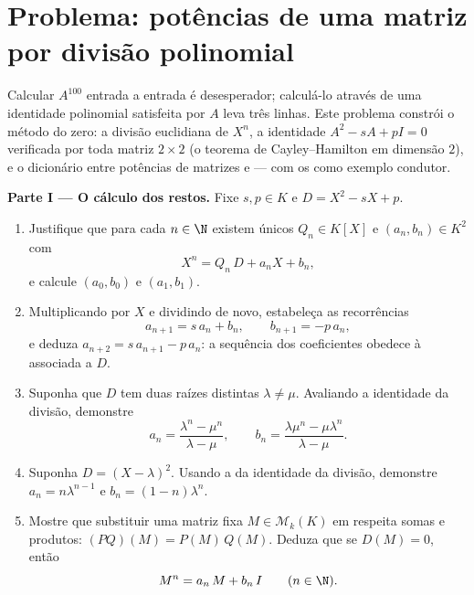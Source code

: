 \section{Problema: potências de uma matriz por divisão polinomial}

\begin{problem}\label{pb:b1:matrices:1}
Calcular $A^{100}$ entrada a entrada é desesperador; calculá-lo
através de uma identidade polinomial satisfeita por $A$ leva três
linhas. Este problema constrói o método do zero: a divisão
euclidiana de $X^n$, a identidade $A^2 - sA + pI = 0$ verificada por toda matriz
$2
\times 2$ (o teorema de Cayley--Hamilton em dimensão $2$), e o
dicionário entre potências de matrizes e  ---
com os  como exemplo condutor.

\medskip
\noindent\textbf{Parte I --- O cálculo dos restos.} Fixe $s, p
\in K$ e
$D = X^2 - sX + p$.
\begin{enumerate}
  \item Justifique que para cada $n \in \N$ existem únicos $Q_n
        \in K[X]$ e $(a_n, b_n) \in K^2$
        com
        \[
        X^n = Q_n\,D + a_n X + b_n ,
        \]
        e calcule $(a_0, b_0)$ e $(a_1, b_1)$.
  \item Multiplicando por $X$ e dividindo de novo, estabeleça as
        recorrências
        \[
        a_{n+1} = s\,a_n + b_n,
        \qquad
        b_{n+1} = -p\,a_n ,
        \]
        e deduza $a_{n+2} = s\,a_{n+1} - p\,a_n$: a sequência dos coeficientes obedece à
         associada a $D$.
  \item Suponha que $D$ tem duas raízes distintas $\lambda \neq \mu$. Avaliando
        a identidade da divisão, demonstre
        \[
        a_n = \frac{\lambda^n - \mu^n}{\lambda - \mu},
        \qquad
        b_n = \frac{\lambda\mu^n - \mu\lambda^n}{\lambda - \mu} .
        \]
  \item Suponha $D = (X - \lambda)^2$. Usando a  da identidade da divisão,
        demonstre $a_n = n\lambda^{n-1}$ e $b_n = (1 - n)\lambda^{n}$.
  \item Mostre que substituir uma matriz fixa $M \in
        \mathcal{M}_k(K)$ em 
        respeita somas e produtos: $(PQ)(M) = P(M)\,Q(M)$. Deduza que se $D(M) =
        0$, então
        \[
        M^n = a_n\,M + b_n\,I \qquad (n \in \N).
        \]
\end{enumerate}


\end{problem}
